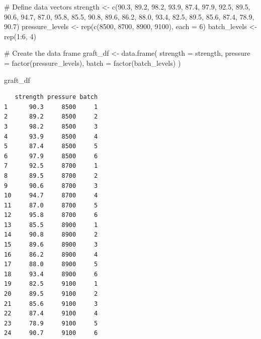 \documentclass[
  letterpaper,
  DIV=11,
  numbers=noendperiod]{scrreprt}
\newenvironment{Shaded}{\begin{snugshade}}{\end{snugshade}}
\newcommand{\AttributeTok}[1]{\textcolor[rgb]{0.40,0.45,0.13}{#1}}
\newcommand{\CommentTok}[1]{\textcolor[rgb]{0.37,0.37,0.37}{#1}}
\newcommand{\DecValTok}[1]{\textcolor[rgb]{0.68,0.00,0.00}{#1}}
\newcommand{\FloatTok}[1]{\textcolor[rgb]{0.68,0.00,0.00}{#1}}
\newcommand{\FunctionTok}[1]{\textcolor[rgb]{0.28,0.35,0.67}{#1}}
\newcommand{\NormalTok}[1]{\textcolor[rgb]{0.00,0.23,0.31}{#1}}
\newcommand{\OtherTok}[1]{\textcolor[rgb]{0.00,0.23,0.31}{#1}}
\newcommand{\SpecialCharTok}[1]{\textcolor[rgb]{0.37,0.37,0.37}{#1}}
\begin{document}
\begin{Shaded}
\begin{Highlighting}[]
\CommentTok{\# Define data vectors}
\NormalTok{strength }\OtherTok{\textless{}{-}} \FunctionTok{c}\NormalTok{(}\FloatTok{90.3}\NormalTok{, }\FloatTok{89.2}\NormalTok{, }\FloatTok{98.2}\NormalTok{, }\FloatTok{93.9}\NormalTok{, }\FloatTok{87.4}\NormalTok{, }\FloatTok{97.9}\NormalTok{,}
              \FloatTok{92.5}\NormalTok{, }\FloatTok{89.5}\NormalTok{, }\FloatTok{90.6}\NormalTok{, }\FloatTok{94.7}\NormalTok{, }\FloatTok{87.0}\NormalTok{, }\FloatTok{95.8}\NormalTok{,}
              \FloatTok{85.5}\NormalTok{, }\FloatTok{90.8}\NormalTok{, }\FloatTok{89.6}\NormalTok{, }\FloatTok{86.2}\NormalTok{, }\FloatTok{88.0}\NormalTok{, }\FloatTok{93.4}\NormalTok{,}
              \FloatTok{82.5}\NormalTok{, }\FloatTok{89.5}\NormalTok{, }\FloatTok{85.6}\NormalTok{, }\FloatTok{87.4}\NormalTok{, }\FloatTok{78.9}\NormalTok{, }\FloatTok{90.7}\NormalTok{)}
\NormalTok{pressure\_levels }\OtherTok{\textless{}{-}} \FunctionTok{rep}\NormalTok{(}\FunctionTok{c}\NormalTok{(}\DecValTok{8500}\NormalTok{, }\DecValTok{8700}\NormalTok{, }\DecValTok{8900}\NormalTok{, }\DecValTok{9100}\NormalTok{), }\AttributeTok{each =} \DecValTok{6}\NormalTok{)}
\NormalTok{batch\_levels }\OtherTok{\textless{}{-}} \FunctionTok{rep}\NormalTok{(}\DecValTok{1}\SpecialCharTok{:}\DecValTok{6}\NormalTok{, }\DecValTok{4}\NormalTok{)}

\CommentTok{\# Create the data frame}
\NormalTok{graft\_df }\OtherTok{\textless{}{-}} \FunctionTok{data.frame}\NormalTok{(}
  \AttributeTok{strength =}\NormalTok{ strength,}
  \AttributeTok{pressure =} \FunctionTok{factor}\NormalTok{(pressure\_levels),}
  \AttributeTok{batch =} \FunctionTok{factor}\NormalTok{(batch\_levels)}
\NormalTok{)}


\NormalTok{graft\_df}
\end{Highlighting}
\end{Shaded}

\begin{verbatim}
   strength pressure batch
1      90.3     8500     1
2      89.2     8500     2
3      98.2     8500     3
4      93.9     8500     4
5      87.4     8500     5
6      97.9     8500     6
7      92.5     8700     1
8      89.5     8700     2
9      90.6     8700     3
10     94.7     8700     4
11     87.0     8700     5
12     95.8     8700     6
13     85.5     8900     1
14     90.8     8900     2
15     89.6     8900     3
16     86.2     8900     4
17     88.0     8900     5
18     93.4     8900     6
19     82.5     9100     1
20     89.5     9100     2
21     85.6     9100     3
22     87.4     9100     4
23     78.9     9100     5
24     90.7     9100     6
\end{verbatim}
\end{document}
